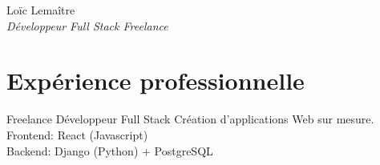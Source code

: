 \documentclass[10pt]{article} %
\begin{document}
\begin{paracol}{2} %


  \parbox[top][0.16\textheight][c]{\linewidth}{ %
    \vspace{-0.04\textheight} %
    \centering %
    {\sffamily\Huge Loïc Lemaître}\\\medskip %
    {\Large\color{headings}\textit{Développeur Full Stack Freelance}}
  }


  \section{Expérience professionnelle}





  {} %
  {Freelance} %
  {Développeur Full Stack} %
  {Création d'applications Web sur mesure.\\
    Frontend: React (Javascript)\\
    Backend: Django (Python) + PostgreSQL}  %



\end{paracol}
\end{document}
